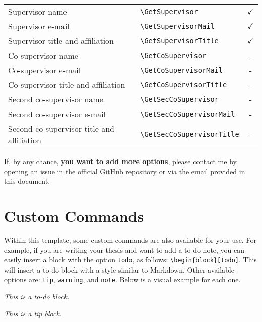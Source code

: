 {\begin{longtable}[c]{llc}
Supervisor name                  & \verb|\GetSupervisor|        & $\checkmark$ \\
Supervisor e-mail                & \verb|\GetSupervisorMail|    & $\checkmark$ \\
Supervisor title and affiliation & \verb|\GetSupervisorTitle|   & $\checkmark$ \\ 

Co-supervisor name                  & \verb|\GetCoSupervisor|       & - \\
Co-supervisor e-mail                & \verb|\GetCoSupervisorMail|   & - \\
Co-supervisor title and affiliation & \verb|\GetCoSupervisorTitle|  & - \\ 

Second co-supervisor name                   & \verb|\GetSecCoSupervisor|      & - \\
Second co-supervisor e-mail                 & \verb|\GetSecCoSupervisorMail|  & - \\
Second co-supervisor title and affiliation  & \verb|\GetSecCoSupervisorTitle| & - \\
\end{longtable}

If, by any chance, \textbf{you want to add more options}, please contact me by opening an issue in the official GitHub repository or via the email provided in this document.

\section{Custom Commands}
Within this template, some custom commands are also available for your use. For example, if you are writing your thesis and want to add a to-do note, you can easily insert a block with the option \verb|todo|, as follows: \verb|\begin{block}[todo]|. This will insert a to-do block with a style similar to Markdown. Other available options are: \verb|tip|, \verb|warning|, and \verb|note|. Below is a visual example for each one.

\vspace{.875em}
\begin{tcbraster}[
    raster columns=2, 
    raster equal height, 
    nobeforeafter, 
    raster column skip=2cm
]
\begin{block}[todo]
    \textit{This is a to-do block.}
\end{block}
\begin{block}[tip]
    \textit{This is a tip block.}
\end{block}
\end{tcbraster}

}

